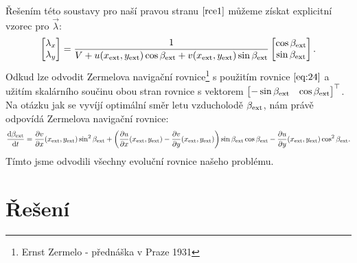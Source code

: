 \documentclass[reqno, a4paper]{amsart}
\numberwithin{equation}{section}
\begin{document}
Řešením této soustavy pro naší pravou stranu $\eqref{rce1}$ můžeme získat explicitní vzorec pro $\vec{\lambda}$:
\begin{equation}
  \label{eq:45}
  \begin{bmatrix}
    \lambda_x \\
    \lambda_y
  \end{bmatrix}
  =
  \frac{1}{V +  u(x_{\mathrm{ext}}, y_{\mathrm{ext}}) \cos \beta_{\mathrm{ext}} +  v(x_{\mathrm{ext}}, y_{\mathrm{ext}}) \sin \beta_{\mathrm{ext}}}
  \begin{bmatrix}
    \cos \beta_{\mathrm{ext}} \\
    \sin \beta_{\mathrm{ext}}
  \end{bmatrix}
  .
\end{equation}
Odkud lze odvodit Zermelova navigační rovnice\footnote{Ernst Zermelo - přednáška v Praze 1931} s použitím rovnice $\eqref{eq:24}$ a užitím skalárního součinu obou stran rovnice s vektorem $
  \transpose{
  \begin{bmatrix}
    -\sin \beta_{\navext} &
     \cos \beta_{\navext}
  \end{bmatrix}
  }
$. Na otázku jak se vyvíjí optimální směr letu vzducholodě $\beta_{\mathrm{ext}}$, nám právě odpovídá Zermelova navigační rovnice:
\begin{equation}
  \label{eq:50}
  \frac{\mathrm{d} {\beta_{\mathrm{ext}}}}{\mathrm{d} {t}}
  =
  \frac{\partial {v}}{\partial {x}}(x_{\mathrm{ext}}, y_{\mathrm{ext}})
  \sin^2 \beta_{\mathrm{ext}}
  +
  \left(
    \frac{\partial {u}}{\partial {x}}(x_{\mathrm{ext}}, y_{\mathrm{ext}})
    -
    \frac{\partial {v}}{\partial {y}}(x_{\mathrm{ext}}, y_{\mathrm{ext}})
  \right)
  \sin \beta_{\mathrm{ext}}
  \cos \beta_{\mathrm{ext}}
  -
  \frac{\partial {u}}{\partial {y}}(x_{\mathrm{ext}}, y_{\mathrm{ext}})
  \cos^2 \beta_{\mathrm{ext}}
  .
\end{equation}
Tímto jsme odvodili všechny evoluční rovnice našeho problému.

\section{Řešení}
\label{sec:Řešení}
\end{document}
